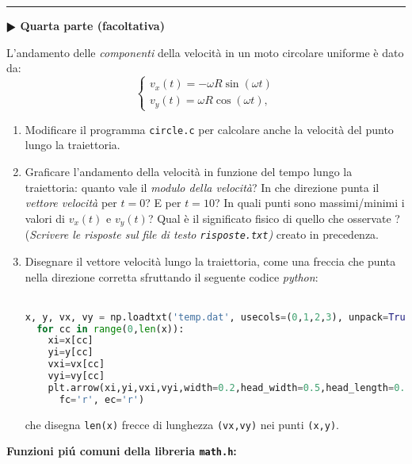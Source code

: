 \documentclass[11pt]{article}
\begin{document}
\hrule
\vspace{1mm}\textbf{$\RHD$ Quarta parte (facoltativa)\\}

L'andamento delle {\em componenti} della velocit\`a in un moto circolare uniforme \`e dato da:
\[
\left\{ \begin{array}{ll} 
v_x(t) = - \omega R \sin \left(\omega t \right)
\\ 
v_y(t) = \omega R \cos \left(\omega t \right),
\end{array}
\right.
\]

\begin{enumerate}
\item Modificare il programma \texttt{circle.c} per calcolare anche la velocit\`a del punto lungo la traiettoria.
\item Graficare l'andamento della velocit\`a in funzione del tempo lungo la traiettoria: quanto vale il {\em modulo della velocit\`a}? In che direzione punta il {\em vettore velocit\`a} per $t=0$?
  E per $t=10$? In quali punti  sono massimi/minimi i valori di $v_x(t)$ e $v_y(t)$? Qual \`e il significato fisico di quello che osservate ? ({\em Scrivere le risposte sul file di testo \texttt{risposte.txt})} creato in precedenza.
\item Disegnare il vettore velocit\`a lungo la traiettoria, come una freccia che punta nella direzione corretta sfruttando
  il seguente codice \emph{python}:\\
\\

\begin{lstlisting}[language=Python,numbers=none]
  x, y, vx, vy = np.loadtxt('temp.dat', usecols=(0,1,2,3), unpack=True)
  for cc in range(0,len(x)):
    xi=x[cc]
    yi=y[cc]
    vxi=vx[cc]
    vyi=vy[cc]
    plt.arrow(xi,yi,vxi,vyi,width=0.2,head_width=0.5,head_length=0.3, 
      fc='r', ec='r')   
\end{lstlisting}
che disegna \texttt{len(x)} frecce di lunghezza \texttt{(vx,vy)} nei punti \texttt{(x,y)}. 
\end{enumerate}  
\vspace{-2mm}
\newpage
\textbf{Funzioni pi\'u comuni della libreria \texttt{math.h}:}
\end{document}
